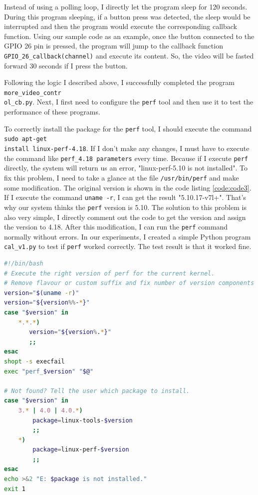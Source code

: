\documentclass[12pt]{report}
\newcommand{\code}[1]{\colorbox{light-gray}{\texttt{#1}}}
\begin{document}
Instead of using a polling loop, I directly let the program sleep for 120 seconds. During this program sleeping, if a button press was detected, the sleep would be interrupted and then the program would execute the corresponding callback function. Using our sample code as an example, once the button connected to the GPIO 26 pin is pressed, the program will jump to the callback function \code{GPIO\_26\_callback(channel)} and execute its content. So, the video will be fasted forward 30 seconds if I press the button.\par
Following the logic I described above, I successfully completed the program \code{more\_video\_contr}\\\code{ol\_cb.py}. Next, I first need to configure the \code{perf} tool and then use it to test the performance of these programs.\par
To correctly install the package for the \code{perf} tool, I should execute the command \code{sudo apt-get }\\\code{install linux-perf-4.18}. If I don't make any changes, I must have to execute the command like \code{perf\_4.18 parameters} every time. Because if I execute \code{perf} directly, the system will return us an error, "linux-perf-5.10 is not installed". To fix this problem, I need to take a glance at the file \code{/usr/bin/perf} and make some modification. The original version is shown in the code listing \ref{code:code3}. If I execute the command \code{uname -r}, I can get the result "5.10.17-v7l+". That's why our system thinks the \code{perf} version is 5.10. The solution to this problem is also very simple, I directly comment out the code to get the version and assign the version to 4.18. After this modification, I can run the \code{perf} command normally without errors. In our experiments, I created a simple Python program \code{cal\_v1.py} to test if \code{perf} worked correctly. The test result is that it worked fine.
\begin{center}
\begin{lstlisting}[language=bash, caption=The original version, label=code:code3]
#!/bin/bash
# Execute the right version of perf for the current kernel.
# Remove flavour or custom suffix and fix number of version components to 2.
version="$(uname -r)"
version="${version%%-*}"
case "$version" in
    *.*.*)
       version="${version%.*}"
       ;;
esac
shopt -s execfail
exec "perf_$version" "$@"

# Not found? Tell the user which package to install.
case "$version" in
    3.* | 4.0 | 4.0.*)
        package=linux-tools-$version
        ;;
    *)
        package=linux-perf-$version
        ;;
esac
echo >&2 "E: $package is not installed."
exit 1
\end{lstlisting}
\end{center}\vspace{-2em}
\end{document}
